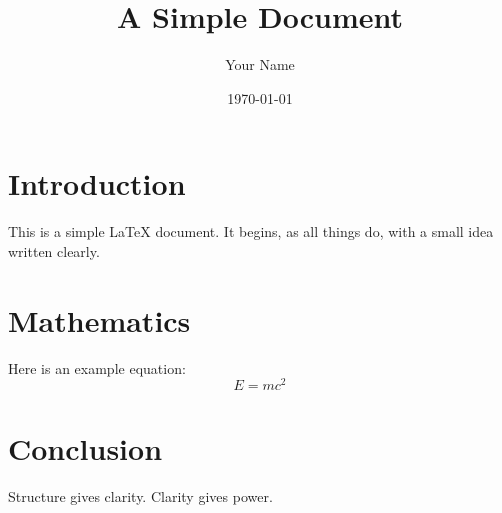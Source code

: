 \documentclass{article}
\title{A Simple Document}
\author{Your Name}
\date{\today}
\begin{document}
\maketitle

\section{Introduction}
This is a simple LaTeX document. It begins, as all things do, with a small idea written clearly.

\section{Mathematics}
Here is an example equation:
\[
E = mc^2
\]

\section{Conclusion}
Structure gives clarity. Clarity gives power.
\end{document}
